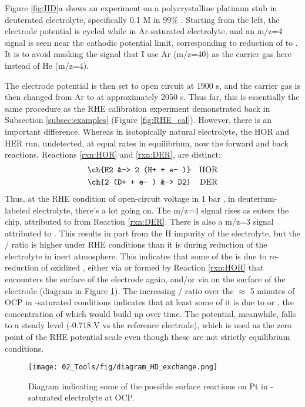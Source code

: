 Figure \ref{fig:HD}a shows an experiment on a polycrystalline platinum stub in deuterated electrolyte, specifically 0.1 M  in 99\% . Starting from the left, the electrode potential is cycled while in Ar-saturated electrolyte, and an m/z=4 signal is seen near the cathodic potential limit, corresponding to reduction of  to . It is to avoid masking the  signal that I use Ar (m/z=40) as the carrier gas here instead of He (m/z=4). 

The electrode potential is then set to open circuit at 1900 s, and the carrier gas is then changed from Ar to  at approximately 2050 s. Thus far, this is essentially the same procedure as the RHE calibration experiment demonstrated back in Subsection \ref{subsec:examples} (Figure \ref{fig:RHE_cal}). However, there is an important difference. Whereas in isotopically natural electrolyte, the HOR and HER run, undetected, at equal rates in equilibrium, now the forward and back reactions, Reactions \ref{rxn:HOR} and \ref{rxn:DER}, are distinct:
\begin{align}
\ch{H2 &-> 2 (H+ + e- )}&&\text{HOR}\label{rxn:HOR}\\
\ch{2 (D+ + e- ) &-> D2}&&\text{DER}\label{rxn:DER}
\end{align}
Thus, at the RHE condition of open-circuit voltage in 1 bar , in deuterium-labeled electrolyte, there's a lot going on. The m/z=4 signal rises as  enters the chip, attributed to  from Reaction \ref{rxn:DER}. There is also a m/z=3 signal attributed to . This  results in part from the H impurity of the electrolyte, but the / ratio is higher under RHE conditions than it is during reduction of the electrolyte in inert atmosphere. This indicates that some of the  is due to re-reduction of oxidized , either via  or  formed by Reaction \ref{rxn:HOR} that encounters the surface of the electrode again, and/or via  on the surface of the electrode (diagram in Figure \ref{fig:HD_diagram}). The increasing / ratio over the $\approx$ 5 minutes of OCP in -saturated conditions indicates that at least some of it is due to  or , the concentration of which would build up over time. The potential, meanwhile, falls to a steady level (-0.718 V vs the reference electrode), which is used as the zero point of the RHE potential scale even though these are not strictly equilibrium conditions.
\begin{figure}[h!]
	\centering
	\texttt{[image: 02\_Tools/fig/diagram\_HD\_exchange.png]}
	\caption{Diagram indicating some of the possible surface reactions on Pt in -saturated  electrolyte at OCP.}
	\label{fig:HD_diagram}
\end{figure}


